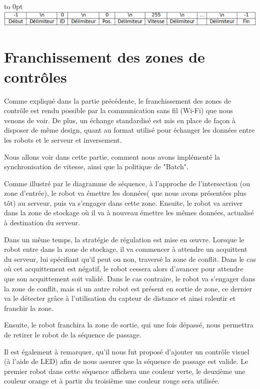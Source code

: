 \documentclass[french,a4paper,12pt]{report}
\begin{document}
\hfill\hbox to 0pt{\hss\includegraphics[width=15cm]{val2.png}\hss}\hfill\null\newline

\chapter{Franchissement des zones de contrôles}
Comme expliqué dans la partie précédente, le franchissement des zones de contrôle est rendu possible par la communication sans fil (Wi-Fi) que nous venons de voir. De plus, un échange standardisé est mis en place de façon à disposer de même design, quant au format utilisé pour échanger les données entre les robots et le serveur et inversement.

Nous allons voir dans cette partie, comment nous avons implémenté la synchronisation de vitesse, ainsi que la politique de "Batch".

Comme illustré par le diagramme de séquence, à l'approche de l'intersection (ou zone d'entrée), le robot va émettre les données( que nous avons présentées plus tôt) au serveur, puis va s'engager dans cette zone.
Ensuite, le robot va arriver dans la zone de stockage où il va à nouveau émettre les mêmes données, actualisé à destination du serveur.

Dans un même temps, la stratégie de régulation est mise en œuvre. Lorsque le robot entre dans la zone de stockage, il va commencer à attendre un acquittent du serveur, lui spécifiant qu'il peut ou non, traversé la zone de conflit. Dans le cas où cet acquittement est négatif, le robot cessera alors d'avancer pour attendre que son acquittement soit validé. Dans le cas contraire, le robot va s'engager dans la zone de conflit, mais si un autre robot est présent en sortie de zone, ce dernier va le détecter grâce à l'utilisation du capteur de distance et ainsi ralentir et franchir la zone.

Ensuite, le robot franchira la zone de sortie, qui une fois dépassé, nous permettra de retirer le robot de la séquence de passage.

Il est également à remarquer, qu'il nous fut proposé d'ajouter un contrôle visuel (à l'aide de LED) afin de nous assurer que la séquence de passage est valide. Le premier robot dans cette séquence affichera une couleur verte, le deuxième une couleur orange et à partir du troisième une couleur rouge sera utilisée.
\end{document}
